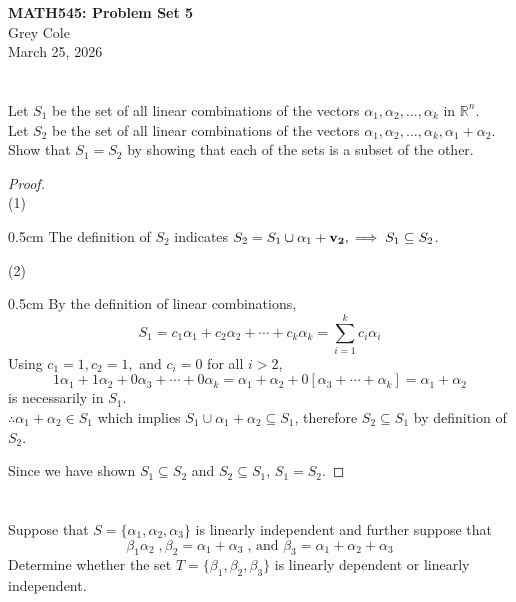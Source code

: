 \documentclass[]{article}
\newcommand{\reals}{\mathbb{R}}
\begin{document}
\begin{center}
	{\Large\textbf{MATH545: Problem Set 5}}\\
	\large Grey Cole\\
	March 25, 2026
\end{center}
\section{}
Let $S_1$ be the set of all linear combinations of the vectors $\alpha_1, \alpha_2, ..., \alpha_k$ in $\reals^n$.\\\noindent
Let $S_2$ be the set of all linear combinations of the vectors $\alpha_1, \alpha_2, ..., \alpha_k, \alpha_1 + \alpha_2$.\\\noindent
Show that $S_1 = S_2$ by showing that each of the sets is a subset of the other.
\begin{proof}$\;$\\
	(1)  \begin{adjustwidth}{0.5cm}{}
	The definition of $S_2$ indicates $S_2 = S_1 \cup \alpha_1 + \vb{v_2}, \implies S_1 \subseteq S_2$.\\
	\end{adjustwidth}
	(2) \begin{adjustwidth}{0.5cm}{}
	By the definition of linear combinations,
	\[ S_1 = c_1\alpha_1 + c_2\alpha_2 + \cdots + c_k\alpha_k = \sum_{i=1}^{k}c_i\alpha_i \]
	Using $c_1 = 1, c_2 = 1,$ and $c_i = 0$ for all $i > 2$, 
	\[ 1\alpha_1 + 1\alpha_2 + 0\alpha_3 + \cdots + 0\alpha_k = \alpha_1 + \alpha_2 + 0[\alpha_3 + \cdots + \alpha_k] = \alpha_1 + \alpha_2 \]
	is necessarily in $S_1$.\\
	$\therefore \alpha_1 + \alpha_2 \in S_1$ which implies $S_1 \cup \alpha_1 + \alpha_2 \subseteq S_1$, therefore $S_2 \subseteq S_1$ by definition of $S_2$.
	\end{adjustwidth}
	Since we have shown $S_1 \subseteq S_2$ and $S_2 \subseteq S_1$, $S_1 = S_2$.
\end{proof}
\section{}
Suppose that $S = \{ \alpha_1, \alpha_2, \alpha_3 \}$ is linearly independent and further suppose that
\[ \beta_1 \alpha_2\;, \beta_2 = \alpha_1 + \alpha_3\;\text{, and } \beta_3 = \alpha_1 + \alpha_2 + \alpha_3\]
Determine whether the set $T = \{\beta_1, \beta_2, \beta_3\}$ is linearly dependent or linearly independent.\\\\
\end{document}
